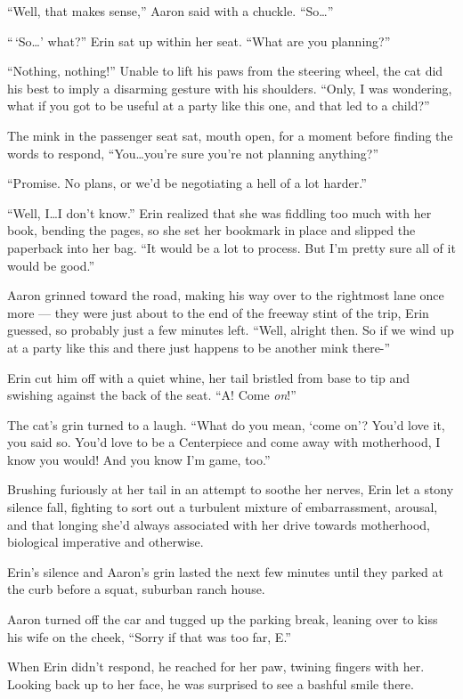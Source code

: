 ``Well, that makes sense,'' Aaron said with a chuckle. ``So\ldots{}''

``\,`So\ldots{}' what?'' Erin sat up within her seat. ``What are you planning?''

``Nothing, nothing!'' Unable to lift his paws from the steering wheel, the cat did his best to imply a disarming gesture with his shoulders. ``Only, I was wondering, what if you got to be useful at a party like this one, and that led to a child?''

The mink in the passenger seat sat, mouth open, for a moment before finding the words to respond, ``You\ldots{}you're sure you're not planning anything?''

``Promise. No plans, or we'd be negotiating a hell of a lot harder.''

``Well, I\ldots{}I don't know.'' Erin realized that she was fiddling too much with her book, bending the pages, so she set her bookmark in place and slipped the paperback into her bag. ``It would be a lot to process. But I'm pretty sure all of it would be good.''

Aaron grinned toward the road, making his way over to the rightmost lane once more --- they were just about to the end of the freeway stint of the trip, Erin guessed, so probably just a few minutes left. ``Well, alright then. So if we wind up at a party like this and there just happens to be another mink there-''

Erin cut him off with a quiet whine, her tail bristled from base to tip and swishing against the back of the seat. ``A! Come \emph{on}!''

The cat's grin turned to a laugh. ``What do you mean, `come on'? You'd love it, you said so. You'd love to be a Centerpiece and come away with motherhood, I know you would! And you know I'm game, too.''

Brushing furiously at her tail in an attempt to soothe her nerves, Erin let a stony silence fall, fighting to sort out a turbulent mixture of embarrassment, arousal, and that longing she'd always associated with her drive towards motherhood, biological imperative and otherwise.

Erin's silence and Aaron's grin lasted the next few minutes until they parked at the curb before a squat, suburban ranch house.

Aaron turned off the car and tugged up the parking break, leaning over to kiss his wife on the cheek, ``Sorry if that was too far, E.''

When Erin didn't respond, he reached for her paw, twining fingers with her. Looking back up to her face, he was surprised to see a bashful smile there.

